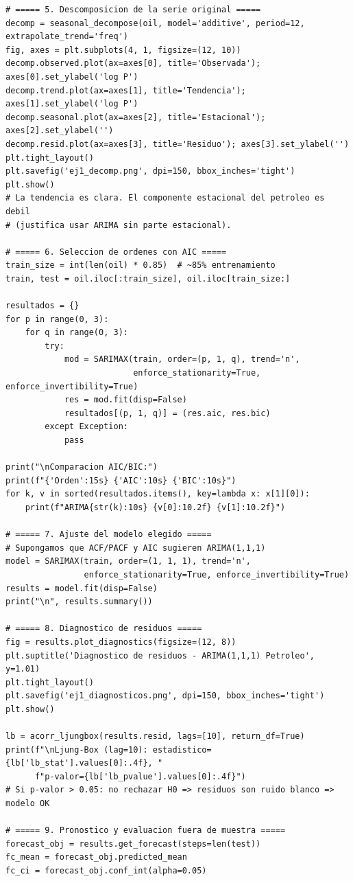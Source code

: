\documentclass[12pt,a4paper]{article}
\theoremstyle{definition}
\begin{document}
\begin{lstlisting}[style=python, caption={Ejemplo 1: ARIMA para log-precios del petróleo WTI}]
# ===== 5. Descomposicion de la serie original =====
decomp = seasonal_decompose(oil, model='additive', period=12, extrapolate_trend='freq')
fig, axes = plt.subplots(4, 1, figsize=(12, 10))
decomp.observed.plot(ax=axes[0], title='Observada'); axes[0].set_ylabel('log P')
decomp.trend.plot(ax=axes[1], title='Tendencia'); axes[1].set_ylabel('log P')
decomp.seasonal.plot(ax=axes[2], title='Estacional'); axes[2].set_ylabel('')
decomp.resid.plot(ax=axes[3], title='Residuo'); axes[3].set_ylabel('')
plt.tight_layout()
plt.savefig('ej1_decomp.png', dpi=150, bbox_inches='tight')
plt.show()
# La tendencia es clara. El componente estacional del petroleo es debil
# (justifica usar ARIMA sin parte estacional).

# ===== 6. Seleccion de ordenes con AIC =====
train_size = int(len(oil) * 0.85)  # ~85% entrenamiento
train, test = oil.iloc[:train_size], oil.iloc[train_size:]

resultados = {}
for p in range(0, 3):
    for q in range(0, 3):
        try:
            mod = SARIMAX(train, order=(p, 1, q), trend='n',
                          enforce_stationarity=True, enforce_invertibility=True)
            res = mod.fit(disp=False)
            resultados[(p, 1, q)] = (res.aic, res.bic)
        except Exception:
            pass

print("\nComparacion AIC/BIC:")
print(f"{'Orden':15s} {'AIC':10s} {'BIC':10s}")
for k, v in sorted(resultados.items(), key=lambda x: x[1][0]):
    print(f"ARIMA{str(k):10s} {v[0]:10.2f} {v[1]:10.2f}")

# ===== 7. Ajuste del modelo elegido =====
# Supongamos que ACF/PACF y AIC sugieren ARIMA(1,1,1)
model = SARIMAX(train, order=(1, 1, 1), trend='n',
                enforce_stationarity=True, enforce_invertibility=True)
results = model.fit(disp=False)
print("\n", results.summary())

# ===== 8. Diagnostico de residuos =====
fig = results.plot_diagnostics(figsize=(12, 8))
plt.suptitle('Diagnostico de residuos - ARIMA(1,1,1) Petroleo', y=1.01)
plt.tight_layout()
plt.savefig('ej1_diagnosticos.png', dpi=150, bbox_inches='tight')
plt.show()

lb = acorr_ljungbox(results.resid, lags=[10], return_df=True)
print(f"\nLjung-Box (lag=10): estadistico={lb['lb_stat'].values[0]:.4f}, "
      f"p-valor={lb['lb_pvalue'].values[0]:.4f}")
# Si p-valor > 0.05: no rechazar H0 => residuos son ruido blanco => modelo OK

# ===== 9. Pronostico y evaluacion fuera de muestra =====
forecast_obj = results.get_forecast(steps=len(test))
fc_mean = forecast_obj.predicted_mean
fc_ci = forecast_obj.conf_int(alpha=0.05)


\end{lstlisting}
\end{document}
